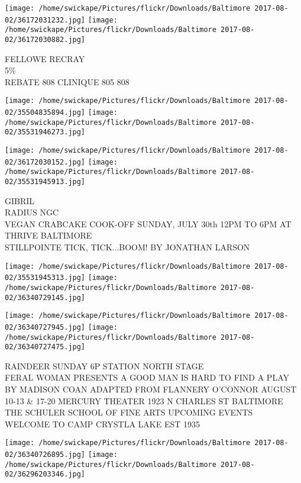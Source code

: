 \documentclass[10pt,letterpaper]{article}
\begin{document}
\vspace{0.25in}
\texttt{[image: /home/swickape/Pictures/flickr/Downloads/Baltimore 2017-08-02/36172031232.jpg]}
\texttt{[image: /home/swickape/Pictures/flickr/Downloads/Baltimore 2017-08-02/36172030882.jpg]}

FELLOWE RECRAY\\
5\%\\
REBATE 808 CLINIQUE 805 808\\
\pagebreak

\texttt{[image: /home/swickape/Pictures/flickr/Downloads/Baltimore 2017-08-02/35504835894.jpg]}
\texttt{[image: /home/swickape/Pictures/flickr/Downloads/Baltimore 2017-08-02/35531946273.jpg]}

\texttt{[image: /home/swickape/Pictures/flickr/Downloads/Baltimore 2017-08-02/36172030152.jpg]}
\texttt{[image: /home/swickape/Pictures/flickr/Downloads/Baltimore 2017-08-02/35531945913.jpg]}

GIBRIL\\
RADIUS NGC\\
VEGAN CRABCAKE COOK{-}OFF SUNDAY, JULY 30th 12PM TO 6PM AT THRIVE BALTIMORE\\
STILLPOINTE TICK, TICK...BOOM!  BY JONATHAN LARSON\\
\pagebreak

\texttt{[image: /home/swickape/Pictures/flickr/Downloads/Baltimore 2017-08-02/35531945313.jpg]}
\texttt{[image: /home/swickape/Pictures/flickr/Downloads/Baltimore 2017-08-02/36340729145.jpg]}

\texttt{[image: /home/swickape/Pictures/flickr/Downloads/Baltimore 2017-08-02/36340727945.jpg]}
\texttt{[image: /home/swickape/Pictures/flickr/Downloads/Baltimore 2017-08-02/36340727475.jpg]}

RAINDEER SUNDAY 6P STATION NORTH STAGE\\
FERAL WOMAN PRESENTS A GOOD MAN IS HARD TO FIND A PLAY BY MADISON COAN ADAPTED FROM FLANNERY O'CONNOR AUGUST 10{-}13 \& 17{-}20 MERCURY THEATER 1923 N CHARLES ST BALTIMORE\\
THE SCHULER SCHOOL OF FINE ARTS UPCOMING EVENTS\\
WELCOME TO CAMP CRYSTLA LAKE EST 1935\\
\pagebreak

\texttt{[image: /home/swickape/Pictures/flickr/Downloads/Baltimore 2017-08-02/36340726895.jpg]}
\texttt{[image: /home/swickape/Pictures/flickr/Downloads/Baltimore 2017-08-02/36296203346.jpg]}
\end{document}
